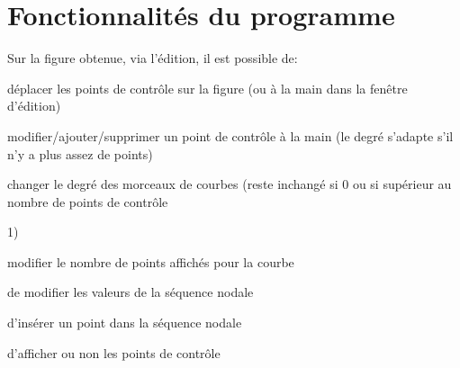 
\section{Fonctionnalit\'es du programme}

Sur la figure obtenue, via l'\'edition, il est possible de:
 
\item d\'eplacer les points de contr\^ole sur la figure (ou \`a la main dans la fen\^etre d'\'edition)
\item modifier/ajouter/supprimer un point de contr\^ole \`a la main (le degr\'e s'adapte s'il n'y a plus assez de points)
\item changer le degr\'e des morceaux de courbes (reste inchang\'e si 0 ou si sup\'erieur au nombre de points de contr\^ole \item 1)
\item modifier le nombre de points affich\'es pour la courbe
\item de modifier les valeurs de la s\'equence nodale %
\item d'ins\'erer un point dans la s\'equence nodale
\item d'afficher ou non les points de contr\^ole




